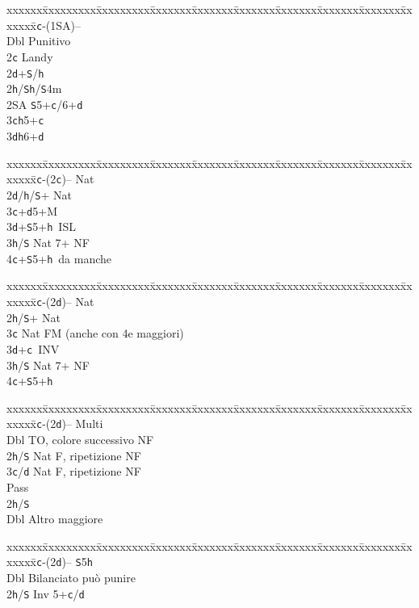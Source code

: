 \documentclass[a4paper,italian]{article}
\newcommand{\BS}{\small{\texttt{S}}}
\newcommand{\BC}{\small{\texttt{c}}}
\newcommand{\BD}{\small{\texttt{d}}}
\newcommand{\BH}{\small{\texttt{h}}}
\newenvironment{bidtable}
{\begin{tabbing}

    xxxxxx\=xxxxxxxxx\=xxxxxxxxx\=xxxxxxx\=xxxxxxx\=xxxxxxx\=xxxxxxx\=xxxxxxx\=xxxxxxx\=xxxxxxx\=\kill}
{\end{tabbing} }%
\begin{document}
\begin{multicols}{2}
    \begin{bidtable}
        1\BC-(1\small{SA})--\+\\
        Dbl \> Punitivo\\
        2\BC \> Landy\\
        2\BD {}+\BS /\BH \\
        2\BH/\BS {}\BH/\BS 4m\\
        2\small{SA} \BS 5+\BC /6+\BD \\
        3\BC {}\BH 5+\BC \\
        3\BD {}\BH 6+\BD \-
    \end{bidtable}
    \bigbreak
    \begin{bidtable}
        1\BC-(2\BC)-- \> \> Nat\+\\
        2\BD/\BH/\BS {}+ Nat\\
        3\BC {}+\BD 5+M\\
        3\BD {}+\BS 5+\BH\ ISL\\
        3\BH/\BS \> Nat 7+ NF\\
        4\BC {}+\BS 5+\BH\ da manche\-
    \end{bidtable}
    \bigbreak
    \begin{bidtable}
        1\BC-(2\BD)-- \> \> Nat\+\\
        2\BH/\BS {}+ Nat\\
        3\BC \> Nat FM (anche con 4e maggiori)\\
        3\BD {}+\BC\ INV\\
        3\BH/\BS \> Nat 7+ NF\\
        4\BC {}+\BS 5+\BH \-
    \end{bidtable}
    \vfill\null
    \columnbreak
    \begin{bidtable}
        1\BC-(2\BD)-- \> \> Multi\+\\
        Dbl \> TO, colore successivo NF\\
        2\BH/\BS \> Nat F, ripetizione NF\\
        3\BC/\BD \> Nat F, ripetizione NF\\
        Pass\+\\
        2\BH/\BS\+\\
        Dbl \> Altro maggiore\-\-\-
    \end{bidtable}
    \begin{bidtable}
        1\BC-(2\BD)-- \> \BS 5\BH \+\\
        Dbl \> Bilanciato può punire\\
        2\BH/\BS \> Inv 5+\BC /\BD \\

\end{bidtable}
\end{multicols}
\end{document}
